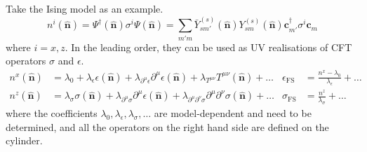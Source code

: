 \documentclass{timesjhep}
\begin{document}
Take the Ising model as an example. 
\begin{equation}
    n^i(\hat{\mathbf{n}})=\Psi^\dagger(\hat{\mathbf{n}})\sigma^i\Psi(\hat{\mathbf{n}})=\sum_{m'm}\bar{Y}^{(s)}_{sm'}(\hat{\mathbf{n}})Y^{(s)}_{sm}(\hat{\mathbf{n}})\mathbf{c}^\dagger_{m'}\sigma^i\mathbf{c}_m 
\end{equation} where $i=x,z$. In the leading order, they can be used as UV realisations of CFT operators $\sigma$ and $\epsilon$.
\begin{align}
    n^x(\hat{\mathbf{n}})&=\lambda_0+\lambda_\epsilon\epsilon(\hat{\mathbf{n}})+\lambda_{\partial^\mu\epsilon}\partial^\mu\epsilon(\hat{\mathbf{n}})+\lambda_{T^{\mu\nu}}T^{\mu\nu}(\hat{\mathbf{n}})+\dots&\epsilon_\mathrm{FS}&=\frac{n^x-\lambda_0}{\lambda_\epsilon}+\dots\nonumber\\
    n^z(\hat{\mathbf{n}})&=\lambda_\sigma\sigma(\hat{\mathbf{n}})+\lambda_{\partial^\mu\sigma}\partial^\mu\epsilon(\hat{\mathbf{n}})+\lambda_{\partial^\mu\partial^\nu\sigma}\partial^\mu\partial^\nu\sigma(\hat{\mathbf{n}})+\dots&\sigma_\mathrm{FS}&=\frac{n^z}{\lambda_\sigma}+\dots 
\end{align} 
where the coefficients $\lambda_0,\lambda_\epsilon,\lambda_\sigma,\dots$ are model-dependent and need to be determined, and all the operators on the right hand side are defined on the cylinder. 
\end{document}
